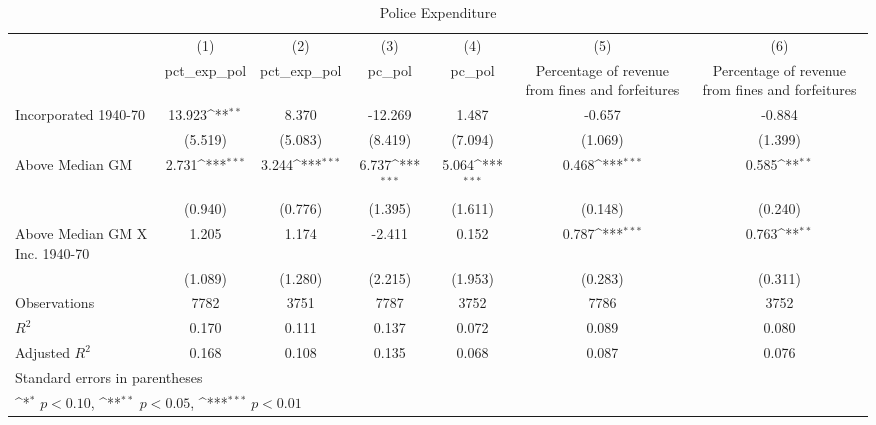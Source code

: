 \begin{table}[htbp]\centering
\def\sym#1{\ifmmode^{#1}\else\(^{#1}\)\fi}
\caption{Police Expenditure}
\begin{tabular}{l*{6}{c}}
\hline\hline
                    &\multicolumn{1}{c}{(1)}&\multicolumn{1}{c}{(2)}&\multicolumn{1}{c}{(3)}&\multicolumn{1}{c}{(4)}&\multicolumn{1}{c}{(5)}&\multicolumn{1}{c}{(6)}\\
                    &\multicolumn{1}{c}{pct\_exp\_pol}&\multicolumn{1}{c}{pct\_exp\_pol}&\multicolumn{1}{c}{pc\_pol}&\multicolumn{1}{c}{pc\_pol}&\multicolumn{1}{c}{Percentage of revenue from fines and forfeitures}&\multicolumn{1}{c}{Percentage of revenue from fines and forfeitures}\\
\hline
Incorporated 1940-70&      13.923\sym{**} &       8.370         &     -12.269         &       1.487         &      -0.657         &      -0.884         \\
                    &     (5.519)         &     (5.083)         &     (8.419)         &     (7.094)         &     (1.069)         &     (1.399)         \\
[1em]
Above Median GM     &       2.731\sym{***}&       3.244\sym{***}&       6.737\sym{***}&       5.064\sym{***}&       0.468\sym{***}&       0.585\sym{**} \\
                    &     (0.940)         &     (0.776)         &     (1.395)         &     (1.611)         &     (0.148)         &     (0.240)         \\
[1em]
Above Median GM X Inc. 1940-70&       1.205         &       1.174         &      -2.411         &       0.152         &       0.787\sym{***}&       0.763\sym{**} \\
                    &     (1.089)         &     (1.280)         &     (2.215)         &     (1.953)         &     (0.283)         &     (0.311)         \\
\hline
Observations        &        7782         &        3751         &        7787         &        3752         &        7786         &        3752         \\
\(R^{2}\)           &       0.170         &       0.111         &       0.137         &       0.072         &       0.089         &       0.080         \\
Adjusted \(R^{2}\)  &       0.168         &       0.108         &       0.135         &       0.068         &       0.087         &       0.076         \\
\hline\hline
\multicolumn{7}{l}{\footnotesize Standard errors in parentheses}\\
\multicolumn{7}{l}{\footnotesize \sym{*} \(p<0.10\), \sym{**} \(p<0.05\), \sym{***} \(p<0.01\)}\\
\end{tabular}
\end{table}
